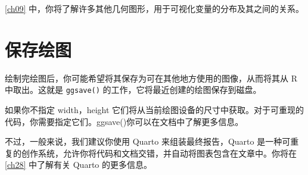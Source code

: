 \autoref{ch09} 中，你将了解许多其他几何图形，用于可视化变量的分布及其之间的关系。

\section{保存绘图}
绘制完绘图后，你可能希望将其保存为可在其他地方使用的图像，从而将其从 R 中取出。这就是 \verb|ggsave()| 的工作，它将最近创建的绘图保存到磁盘。

如果你不指定 width，height 它们将从当前绘图设备的尺寸中获取。对于可重现的代码，你需要指定它们。ggsave()你可以在文档中了解更多信息。

不过，一般来说，我们建议你使用 Quarto 来组装最终报告，Quarto 是一种可重复的创作系统，允许你将代码和文档交错，并自动将图表包含在文章中。你将在 \autoref{ch28} 中了解有关 Quarto 的更多信息。